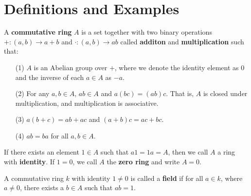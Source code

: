 \section{Definitions and Examples}
\label{section1}

\begin{definition}
    A \textbf{commutative ring} $A$ is a set together with two binary operations
    $+:(a,b) \xrightarrow{} a+b$ and $\cdot:(a,b) \xrightarrow{} ab$ called
    \textbf{additon} and \textbf{multiplication} such that:
    \begin{enumerate}
        \item[(1)] $A$ is an Abelian group over $+$, where we denote the
            identity element as $0$ and the inverse of each $a \in A$ as $-a$.

        \item[(2)] For any $a,b \in A$,  $ab \in A$ and $a(bc)=(ab)c$. That is,
            $A$ is closed under multiplication, and  multiplication is
            associative.

        \item[(3)] $a(b+c)=ab+ac$ and $(a+b)c=ac+bc$.

        \item[(4)] $ab=ba$ for all  $a,b \in A$.
    \end{enumerate}
     If there exists an element $1 \in A$ such that  $a1=1a=A$, then we call
     $A$ a ring with \textbf{identity}. If $1=0$, we call  $A$ the  \textbf{zero
     ring} and write $A=0$.
\end{definition}

\begin{definition}
    A commutative ring $k$ with identity $1 \neq 0$ is called a
    \textbf{field} if for all $a \in k$, where  $a \neq 0$, there exists
    a $b \in A$ such that $ab=1$.
\end{definition}

